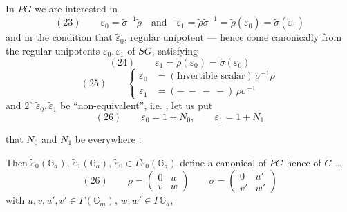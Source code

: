 In $PG$ we are interested in
\[
(23)\qquad
\widetilde\varepsilon_0
=\widetilde\sigma^{-1}\widetilde\rho
\quad\text{and}\quad
\widetilde\varepsilon_1
=\widetilde\rho\widetilde\sigma^{-1}
=\widetilde\rho(\widetilde\varepsilon_0)
=\widetilde\sigma(\widetilde\varepsilon_1)
\]
and in the condition that
$\widetilde\varepsilon_0$,
 regular unipotent —
hence 
come canonically from the
regular unipotents $\varepsilon_0,\varepsilon_1$ of $SG$,
satisfying
\[
(24)\qquad
\varepsilon_1=\widetilde\rho(\varepsilon_0)
=\widetilde\sigma(\varepsilon_0)
\]
\[
(25)\qquad
\left\{
\begin{aligned}
\varepsilon_0&=(\text{Invertible scalar})\,\sigma^{-1}\rho\\
\varepsilon_1&=(-\ -\ -\ -)\,\rho\sigma^{-1}
\end{aligned}
\right.
\]
and \textcircled{\(2^\circ\)}
$\widetilde\varepsilon_0,\widetilde\varepsilon_1$ be
``non-equivalent'',
i.e. , let us put
\[
(26)\qquad
\varepsilon_0=1+N_0,\qquad
\varepsilon_1=1+N_1
\]



that $N_0$ and $N_1$ be everywhere
.

Then $\widetilde\varepsilon_0(\mathbb G_a)$,
$\widetilde\varepsilon_1(\mathbb G_a)$,
$\widetilde\varepsilon_0\in\Gamma
\widetilde\varepsilon_0(\mathbb G_a)$ define
a canonical 
 of $PG$ hence of $G$ \ldots
{}
\[
(26)\qquad
\rho=\begin{pmatrix}0&u\\v&w\end{pmatrix}
\qquad
\sigma=\begin{pmatrix}0&u'\\v'&w'\end{pmatrix}
\]
with $u,v,u',v'\in\Gamma(\mathbb G_m)$,
$w,w'\in\Gamma\mathbb G_a$,
\deleted{$\unsure{\rho}$}

